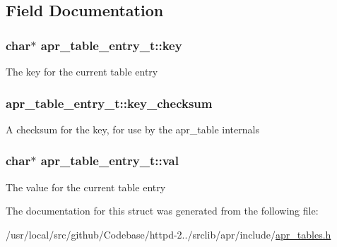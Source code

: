 \subsection{Field Documentation}
\subsubsection[{\texorpdfstring{key}{key}}]{\setlength{\rightskip}{0pt plus 5cm}char$\ast$ apr\+\_\+table\+\_\+entry\+\_\+t\+::key}\hypertarget{structapr__table__entry__t_abdccb35ea49dd95082fdce65a5a6001f}{}\label{structapr__table__entry__t_abdccb35ea49dd95082fdce65a5a6001f}
The key for the current table entry 
\subsubsection[{\texorpdfstring{key\+\_\+checksum}{key_checksum}}]{ apr\+\_\+table\+\_\+entry\+\_\+t\+::key\+\_\+checksum}\hypertarget{structapr__table__entry__t_a0c51574420b6cc7bc6c2e35710e0ad3a}{}\label{structapr__table__entry__t_a0c51574420b6cc7bc6c2e35710e0ad3a}
A checksum for the key, for use by the apr\+\_\+table internals 
\subsubsection[{\texorpdfstring{val}{val}}]{\setlength{\rightskip}{0pt plus 5cm}char$\ast$ apr\+\_\+table\+\_\+entry\+\_\+t\+::val}\hypertarget{structapr__table__entry__t_a755371d0aa6a9487b502c34807271e6f}{}\label{structapr__table__entry__t_a755371d0aa6a9487b502c34807271e6f}
The value for the current table entry 

The documentation for this struct was generated from the following file\+:\begin{DoxyCompactItemize}
\item 
/usr/local/src/github/\+Codebase/httpd-\/2../srclib/apr/include/\hyperlink{apr__tables_8h}{apr\+\_\+tables.\+h}\end{DoxyCompactItemize}
